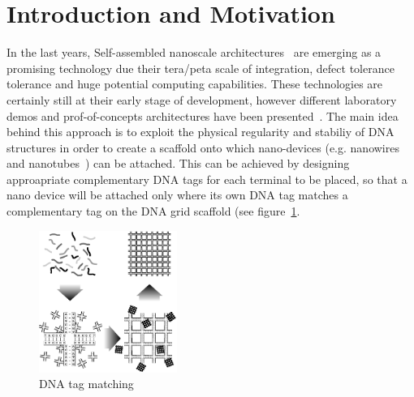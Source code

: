 
\section{Introduction and Motivation}


In the last years, Self-assembled nanoscale architectures~\cite{winfree1998, yan2003}
are emerging as a promising technology due their tera/peta scale of
integration, defect tolerance tolerance and huge potential computing
capabilities. These technologies are certainly still at
their early stage of development, however different laboratory demos and
prof-of-concepts architectures have been presented~\cite{patwardhan2004, patwardhan2006, patwardhan2006_1, pistol2009}.
The main idea behind this approach is to exploit the physical regularity and
stabiliy of DNA structures in order to create a scaffold onto which
nano-devices (e.g. nanowires and nanotubes~\cite{bachtold2001, tans1998, cui2001}) can be
attached. This can be achieved by designing approapriate complementary DNA tags for
each terminal to be placed, so that a nano device will be attached
only where its own DNA tag matches a complementary tag on the DNA grid
scaffold (see figure~\ref{fig:dna_tag}.

\begin{figure}
  \centering
    \includegraphics[width=0.40\textwidth]{pictures/dna2b.eps}
  \caption{DNA tag matching}
  \label{fig:dna_tag}
\end{figure}

